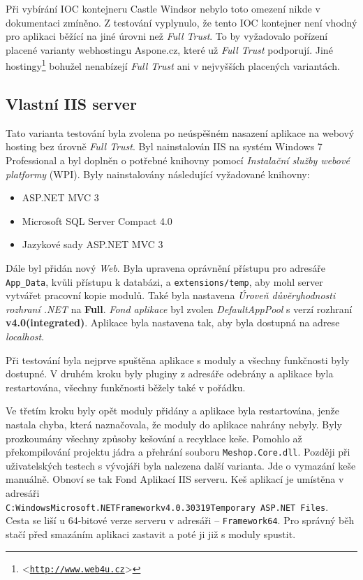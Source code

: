 \documentclass[11pt,twoside,a4paper]{book}
\let\oldUrl\url
\renewcommand\url[1]{<\texttt{\oldUrl{#1}}>}
\begin{document}
Při vybírání IOC kontejneru Castle Windsor nebylo toto omezení nikde v dokumentaci zmíněno. Z testování vyplynulo, že tento IOC kontejner není vhodný pro aplikaci běžící na jiné úrovni než \textit{Full Trust}. To by vyžadovalo pořízení placené varianty webhostingu Aspone.cz, které už \textit{Full Trust} podporují. Jiné hostingy\footnote{\url{http://www.web4u.cz}} bohužel nenabízejí \textit{Full Trust} ani v nejvyšších placených variantách.

\subsection{Vlastní IIS server}
Tato varianta testování byla zvolena po neúspěšném nasazení aplikace na webový hosting bez úrovně \textit{Full Trust}. Byl nainstalován IIS na systém Windows 7 Professional a byl doplněn o potřebné knihovny pomocí \textit{Instalační služby webové platformy} (WPI). Byly nainstalovány následující vyžadované knihovny:

\begin{itemize}
\item ASP.NET MVC 3
\item Microsoft SQL Server Compact 4.0
\item Jazykové sady ASP.NET MVC 3
\end{itemize}

Dále byl přidán nový \textit{Web}. Byla upravena oprávnění přístupu pro adresáře \texttt{App\_Data}, kvůli přístupu k databázi, a \texttt{extensions/temp}, aby mohl server vytvářet pracovní kopie modulů. Také byla nastavena \textit{Úroveň důvěryhodnosti rozhraní .NET} na \textbf{Full}. \textit{Fond aplikace} byl zvolen \textit{DefaultAppPool} s verzí rozhraní \textbf{v4.0(integrated)}. Aplikace byla nastavena tak, aby byla dostupná na adrese \textit{localhost}.

Při testování byla nejprve spuštěna aplikace s moduly a všechny funkčnosti byly dostupné. V druhém kroku byly pluginy z adresáře odebrány a aplikace byla restartována, všechny funkčnosti běžely také v pořádku.

\label{test:problem}
Ve třetím kroku byly opět moduly přidány a aplikace byla restartována, jenže nastala chyba, která naznačovala, že moduly do aplikace nahrány nebyly. Byly prozkoumány všechny způsoby kešování a recyklace keše. Pomohlo až překompilování projektu jádra a přehrání souboru \texttt{Meshop.Core.dll}. Později při uživatelských testech s vývojáři byla nalezena další varianta. Jde o vymazání keše manuálně. Obnoví se tak Fond Aplikací IIS serveru. Keš aplikací je umístěna v adresáři 
\\\texttt{C:WindowsMicrosoft.NETFrameworkv4.0.30319Temporary ASP.NET Files}. 
\\Cesta se liší u 64-bitové verze serveru v adresáři -- \texttt{Framework64}. Pro správný běh stačí před smazáním aplikaci zastavit a poté ji již s moduly spustit. 
\end{document}
